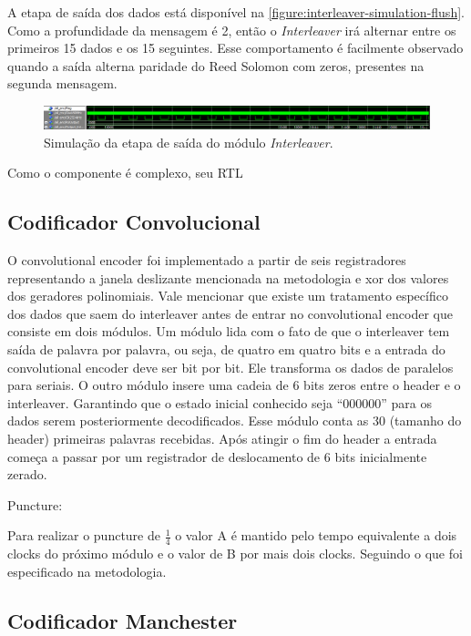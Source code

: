	A etapa de saída dos dados está disponível na \autoref{figure:interleaver-simulation-flush}. Como a profundidade da mensagem é 2, então o \textit{Interleaver} irá alternar entre os primeiros 15 dados e os 15 seguintes. Esse comportamento é facilmente observado quando a saída alterna paridade do Reed Solomon com zeros, presentes na segunda mensagem.
	
	\begin{figure}[h]
		\caption{\label{figure:interleaver-simulation-flush}Simulação da etapa de saída do módulo \textit{Interleaver}.}
		\centering
		\includegraphics[width=1\textwidth]{interleaver/simulation-flush.png}
	\end{figure}

	Como o componente é complexo, seu RTL
	
	\subsection{Codificador Convolucional}	
	
	O convolutional encoder foi implementado a partir de seis registradores representando a janela deslizante mencionada na metodologia e xor dos valores dos geradores polinomiais.
	Vale mencionar que existe um tratamento específico dos dados que saem do interleaver antes de entrar no convolutional encoder que consiste em dois módulos. Um módulo lida com o fato de que o interleaver tem saída de palavra por palavra, ou seja, de quatro em quatro bits e a entrada do convolutional encoder deve ser bit por bit. Ele transforma os dados de paralelos para seriais.
	O outro módulo insere uma cadeia de 6 bits zeros entre o header e o interleaver. Garantindo que o estado inicial conhecido seja “000000” para os dados serem posteriormente decodificados. Esse módulo conta as 30 (tamanho do header) primeiras palavras recebidas. Após atingir o fim do header a entrada começa a passar por um registrador de deslocamento de 6 bits inicialmente zerado.
	
	Puncture:
	
	Para realizar o puncture de $\frac{1}{4}$ o valor A é mantido pelo tempo equivalente a dois clocks do próximo módulo e o valor de B por mais dois clocks. Seguindo o que foi especificado na metodologia.
	
	\subsection{Codificador Manchester}
	

